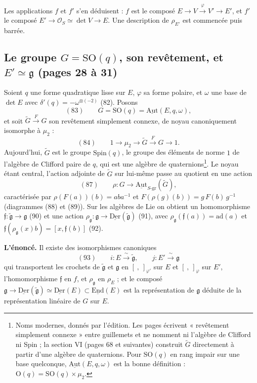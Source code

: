 \documentclass[11pt,a4paper]{article}
\begin{document}
Les applications $f$ et $f'$ s'en déduisent : $f$ est le composé
$E \to V \xrightarrow{\varphi} V' \to E'$, et $f'$ le composé
$E' \to \mathcal{O}_S \simeq \det V \to E$. Une description de $\rho_{E'}$ est commencée
puis barrée.

\subsection*{Le groupe $G = \mathrm{SO}(q)$, son revêtement, et $E' \simeq \mathfrak{g}$ (pages 28 à 31)}

Soient $q$ une forme quadratique lisse sur $E$, $\varphi$ sa forme polaire, et
$\omega$ une base de $\det E$ avec $\delta'(q) = -\omega^{\otimes(-2)}$ (82). Posons
\[
  (83) \qquad G = \mathrm{SO}(q) = \underline{\mathrm{Aut}}(E, q, \omega) ,
\]
et soit $\widetilde{G} \xrightarrow{F} G$ son revêtement simplement connexe, de noyau
canoniquement isomorphe à $\mu_2$ :
\[
  (84) \qquad 1 \longrightarrow \mu_2 \longrightarrow \widetilde{G} \xrightarrow{\ F\ } G \longrightarrow 1 .
\]
Aujourd'hui, $\widetilde{G}$ est le groupe $\mathrm{Spin}(q)$, le groupe des éléments
de norme $1$ de l'algèbre de Clifford paire de $q$, qui est une algèbre de
quaternions\footnote{Noms modernes, donnés par l'édition. Les pages écrivent
« revêtement simplement connexe » entre guillemets et ne nomment ni l'algèbre de
Clifford ni Spin ; la section VI (pages 68 et suivantes) construit $\widetilde{G}$
directement à partir d'une algèbre de quaternions. Pour $\mathrm{SO}(q)$ en rang
impair sur une base quelconque, $\underline{\mathrm{Aut}}(E, q, \omega)$ est la bonne
définition : $\mathrm{O}(q) = \mathrm{SO}(q) \times \mu_2$.}. Le noyau étant central,
l'action adjointe de $\widetilde{G}$ sur lui-même passe au quotient en une action
\[
  (87) \qquad \rho : G \longrightarrow \underline{\mathrm{Aut}}_{S\text{-}\mathrm{gr}}(\widetilde{G}) ,
\]
caractérisée par $\rho(F(a))(b) = aba^{-1}$ et $F(\rho(g)(b)) = g\,F(b)\,g^{-1}$
(diagrammes (88) et (89)). Sur les algèbres de Lie on obtient un homomorphisme
$\mathfrak{f} : \widetilde{\mathfrak{g}} \to \mathfrak{g}$ (90) et une action
$\rho_{\mathfrak{g}} : \mathfrak{g} \to \underline{\mathrm{Der}}(\widetilde{\mathfrak{g}})$ (91),
avec $\rho_{\mathfrak{g}}(\mathfrak{f}(a)) = \mathrm{ad}(a)$ et
$\mathfrak{f}(\rho_{\mathfrak{g}}(x)b) = [x, \mathfrak{f}(b)]$ (92).

\textbf{L'énoncé.} Il existe des isomorphismes canoniques
\[
  (93) \qquad i : E \xrightarrow{\ \sim\ } \widetilde{\mathfrak{g}} , \qquad
  j : E' \xrightarrow{\ \sim\ } \mathfrak{g}
\]
qui transportent les crochets de $\widetilde{\mathfrak{g}}$ et $\mathfrak{g}$ en
$[\ ,\ ]_{\varphi'}$ sur $E$ et $[\ ,\ ]_{\varphi}$ sur $E'$, l'homomorphisme
$\mathfrak{f}$ en $f$, et $\rho_{\mathfrak{g}}$ en $\rho_E$ ; et le composé
$\mathfrak{g} \to \underline{\mathrm{Der}}(\widetilde{\mathfrak{g}}) \simeq
\underline{\mathrm{Der}}(E) \subset \underline{\mathrm{End}}(E)$ est la
représentation de $\mathfrak{g}$ déduite de la représentation linéaire de $G$ sur
$E$.
\end{document}
